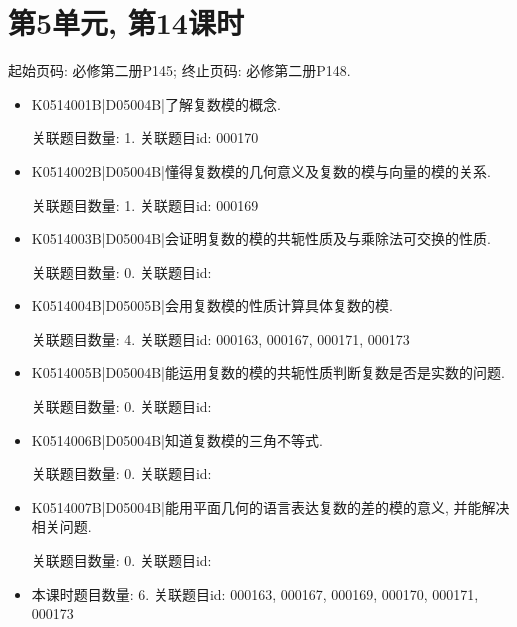 \section*{第5单元, 第14课时}
起始页码: 必修第二册P145; 终止页码: 必修第二册P148.
\begin{itemize}
\item K0514001B|D05004B|了解复数模的概念.

关联题目数量: 1. 关联题目id: 000170

\item K0514002B|D05004B|懂得复数模的几何意义及复数的模与向量的模的关系.

关联题目数量: 1. 关联题目id: 000169

\item K0514003B|D05004B|会证明复数的模的共轭性质及与乘除法可交换的性质.

关联题目数量: 0. 关联题目id: 

\item K0514004B|D05005B|会用复数模的性质计算具体复数的模.

关联题目数量: 4. 关联题目id: 000163, 000167, 000171, 000173

\item K0514005B|D05004B|能运用复数的模的共轭性质判断复数是否是实数的问题.

关联题目数量: 0. 关联题目id: 

\item K0514006B|D05004B|知道复数模的三角不等式.

关联题目数量: 0. 关联题目id: 

\item K0514007B|D05004B|能用平面几何的语言表达复数的差的模的意义, 并能解决相关问题.

关联题目数量: 0. 关联题目id: 

\item 本课时题目数量: 6. 关联题目id: 000163, 000167, 000169, 000170, 000171, 000173

\end{itemize}

